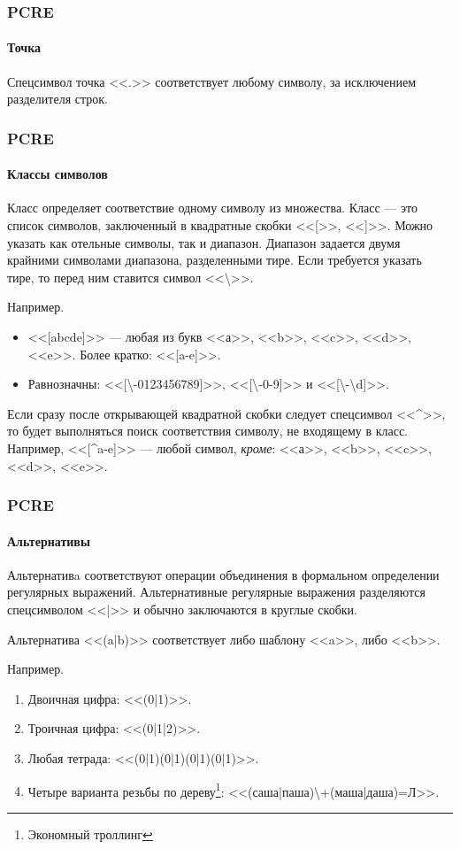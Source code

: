 \begin{frame}
    \frametitle{PCRE}
    \framesubtitle{Точка}

    Спецсимвол точка <<.>> соответствует любому символу, за исключением разделителя строк.
\end{frame}

\begin{frame}
    \frametitle{PCRE}
    \framesubtitle{Классы символов}
    
    \alert{Класс} определяет соответствие одному символу из множества. Класс --- это список символов, заключенный в квадратные скобки <<[>>, <<]>>. Можно указать как отельные символы, так и диапазон. Диапазон задается двумя крайними символами диапазона, разделенными тире. Если требуется указать тире, то перед ним ставится символ <<\textbackslash>>. 
    
    Например.
    \begin{itemize}
        \item{} <<[abcde]>> --- любая из букв <<а>>, <<b>>, <<c>>, <<d>>, <<e>>. Более кратко: <<[a-e]>>.
        \item Равнозначны: <<[\textbackslash-0123456789]>>, <<[\textbackslash-0-9]>> и <<[\textbackslash-\textbackslash d]>>.
    \end{itemize}
     Если сразу после открывающей квадратной скобки следует спецсимвол <<\^{}>>, то будет выполняться поиск соответствия символу, не входящему в класс. Например, <<[\^{}a-e]>> --- любой символ, \emph{кроме}: <<а>>, <<b>>, <<c>>, <<d>>, <<e>>.
\end{frame}


\begin{frame}
    \frametitle{PCRE}
    \framesubtitle{Альтернативы}
    
    \alert{Альтернативa} соответствуют операции объединения в формальном определении регулярных выражений. Альтернативные регулярные выражения разделяются спецсимволом <<|>> и обычно заключаются в круглые скобки.

    Альтернатива <<(a|b)>> соответствует либо шаблону <<a>>, либо <<b>>.
    
    Например.
    \begin{enumerate}
        \item Двоичная цифра: <<(0|1)>>.
        \item Троичная цифра: <<(0|1|2)>>.
        \item Любая тетрада:  <<(0|1)(0|1)(0|1)(0|1)>>.
        \item Четыре варианта резьбы по дереву\footnote{Экономный троллинг}: <<(саша|паша)\textbackslash+(маша|даша)=Л>>.
    \end{enumerate}
\end{frame}


